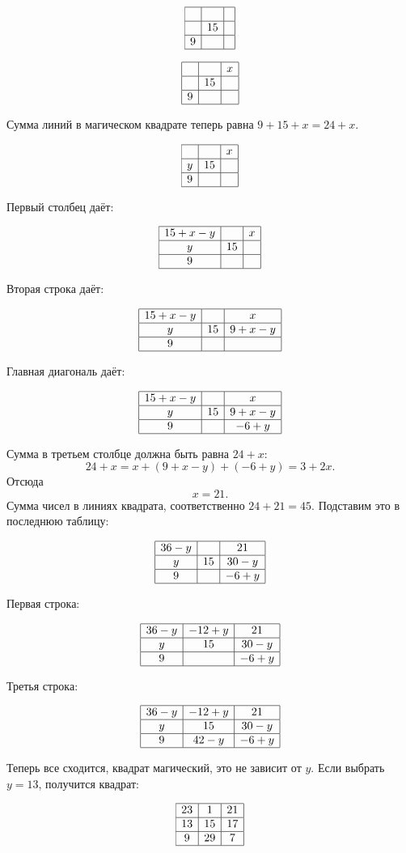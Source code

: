 \documentclass{article}
\newcommand{\m}[9]{
$$
\begin{array}{|c|c|c|}
\hline
#1&#2&#3\\
\hline
#4&#5&#6\\
\hline
#7&#8&#9\\
\hline
\end{array}
$$
}
\begin{document}
	\m{}{}{} {}{15}{} {9}{}{}
	
	\m{}{}{x} {}{15}{} {9}{}{}
	
Сумма линий в магическом квадрате теперь равна $9 + 15 + x=24 + x$.
	
	\m{}{}{x} {y}{15}{} {9}{}{}
	
Первый столбец даёт:
	\m{15+x-y}{}{x} {y}{15}{} {9}{}{}

Вторая строка даёт:
    \m{15+x-y}{}{x} {y}{15}{9+x-y} {9}{}{}

Главная диагональ даёт:
    \m{15+x-y}{}{x} {y}{15}{9+x-y} {9}{}{-6+y}
    
Сумма в третьем столбце должна быть равна $24+x$:
$$24+x = x + (9 + x - y) + (-6 + y) = 3 + 2x.$$
Отсюда
$$x=21.$$ Сумма чисел в линиях квадрата, соответственно $24 + 21=45$. Подставим это в последнюю таблицу:

\m{36-y}{}{21} {y}{15}{30-y} {9}{}{-6+y}

Первая строка:
\m{36-y}{-12+y}{21} {y}{15}{30-y} {9}{}{-6+y}

Третья строка:
\m{36-y}{-12+y}{21} {y}{15}{30-y} {9}{42-y}{-6+y}

Теперь все сходится, квадрат магический, это не зависит от $y$. Если выбрать $y=13$, получится квадрат:

\m{23}{1}{21} {13}{15}{17} {9}{29}{7}
\end{document}
